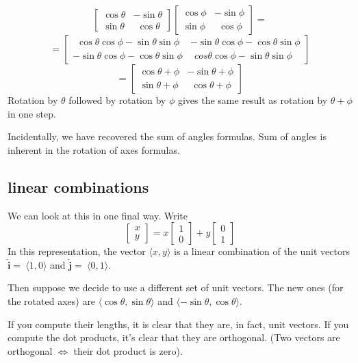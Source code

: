 \documentclass[11pt, oneside]{article}
\begin{document}
\[
\begin{bmatrix}  
\cos \theta & -\sin \theta \\
\sin \theta & \ \  \cos \theta
\end{bmatrix}
\begin{bmatrix}  
\cos \phi & - \sin \phi \\
\sin \phi & \ \ \cos \phi
\end{bmatrix}
=
\]
\[ =
\begin{bmatrix}  
\ \ \cos \theta \cos \phi -  \sin \theta \sin \phi & - \sin \theta \cos \phi - \cos \theta \sin \phi \\
- \sin \theta \cos \phi - \cos \theta \sin \phi & \ \ cos \theta \cos \phi -  \sin \theta \sin \phi 
\end{bmatrix}
\]
\[
=
\begin{bmatrix}  
\cos \theta + \phi & - \sin \theta + \phi \\
\sin \theta + \phi & \ \ \cos \theta + \phi
\end{bmatrix}
\]
Rotation by $\theta$ followed by rotation by $\phi$ gives the same result as rotation by $\theta + \phi$ in one step.

Incidentally, we have recovered the sum of angles formulas.  Sum of angles is inherent in the rotation of axes formulas.

\subsection*{linear combinations}
We can look at this in one final way.  Write
\[
\begin{bmatrix}  x \\ y \end{bmatrix}
=
x
\begin{bmatrix}  1 \\ 0 \end{bmatrix}
+
y
\begin{bmatrix}  0 \\ 1 \end{bmatrix}
\]
In this representation, the vector $\langle x,y \rangle$ is a linear combination of the unit vectors $\mathbf{\hat{i}} =\ \langle 1,0 \rangle$ and $\mathbf{\hat{j}}  =\ \langle 0,1 \rangle$.

Then suppose we decide to use a different set of unit vectors.  The new ones (for the rotated axes) are $\langle \cos \theta,\sin \theta \rangle$ and $\langle -\sin \theta,\cos \theta \rangle$.  

If you compute their lengths, it is clear that they are, in fact, unit vectors.  If you compute the dot products, it's clear that they are orthogonal.  (Two vectors are orthogonal $\iff$ their dot product is zero).
\end{document}

